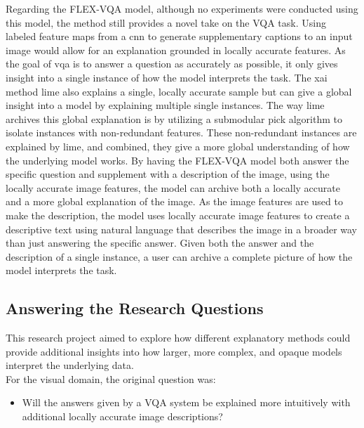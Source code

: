 Regarding the FLEX-VQA model, although no experiments were conducted using this model, the method still provides a novel take on the VQA task. Using labeled feature maps from a \gls{cnn} to generate supplementary captions to an input image would allow for an explanation grounded in locally accurate features.
As the goal of \gls{vqa} is to answer a question as accurately as possible, it only gives insight into a single instance of how the model interprets the task. The \gls{xai} method \gls{lime} also explains a single, locally accurate sample but can give a global insight into a model by explaining multiple single instances. The way \gls{lime} archives this global explanation is by utilizing a submodular pick algorithm to isolate instances with non-redundant features. These non-redundant instances are explained by \gls{lime}, and combined, they give a more global understanding of how the underlying model works.
By having the FLEX-VQA model both answer the specific question and supplement with a description of the image, using the locally accurate image features, the model can archive  both a locally accurate and a more global explanation of the image. As the image features are used to make the description, the model uses locally accurate image features to create a descriptive text using natural language that describes the image in a broader way than just answering the specific answer. Given both the answer and the description of a single instance, a user can archive a complete picture of how the model interprets the task.



\subsection{Answering the Research Questions}

This research project aimed to explore how different explanatory methods could provide additional insights into how larger, more complex, and opaque models interpret the underlying data.\\
For the visual domain, the original question was:
\begin{itemize}
    \item Will the answers given by a VQA system be explained more intuitively with additional locally accurate image descriptions?
\end{itemize}

